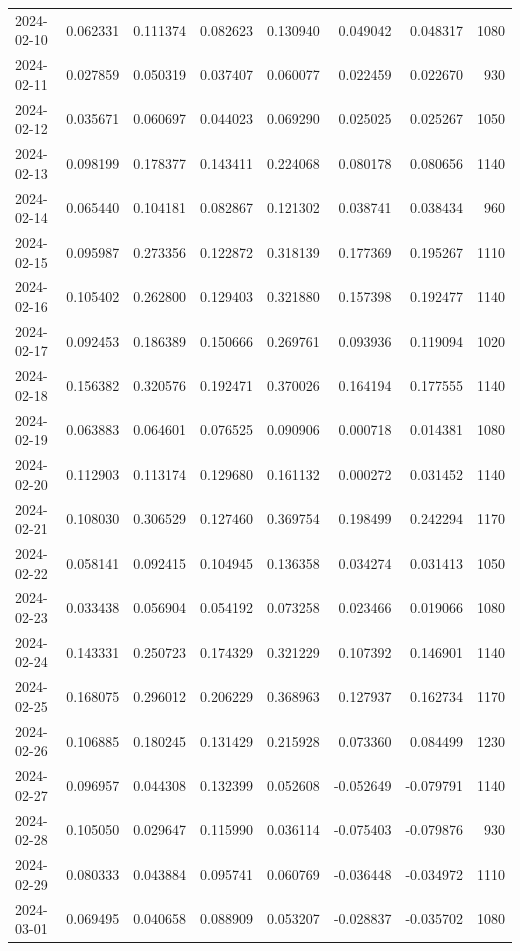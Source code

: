\begin{tabular}{lrrrrrrr}
2024-02-10 & 0.062331 & 0.111374 & 0.082623 & 0.130940 & 0.049042 & 0.048317 & 1080 \\
2024-02-11 & 0.027859 & 0.050319 & 0.037407 & 0.060077 & 0.022459 & 0.022670 & 930 \\
2024-02-12 & 0.035671 & 0.060697 & 0.044023 & 0.069290 & 0.025025 & 0.025267 & 1050 \\
2024-02-13 & 0.098199 & 0.178377 & 0.143411 & 0.224068 & 0.080178 & 0.080656 & 1140 \\
2024-02-14 & 0.065440 & 0.104181 & 0.082867 & 0.121302 & 0.038741 & 0.038434 & 960 \\
2024-02-15 & 0.095987 & 0.273356 & 0.122872 & 0.318139 & 0.177369 & 0.195267 & 1110 \\
2024-02-16 & 0.105402 & 0.262800 & 0.129403 & 0.321880 & 0.157398 & 0.192477 & 1140 \\
2024-02-17 & 0.092453 & 0.186389 & 0.150666 & 0.269761 & 0.093936 & 0.119094 & 1020 \\
2024-02-18 & 0.156382 & 0.320576 & 0.192471 & 0.370026 & 0.164194 & 0.177555 & 1140 \\
2024-02-19 & 0.063883 & 0.064601 & 0.076525 & 0.090906 & 0.000718 & 0.014381 & 1080 \\
2024-02-20 & 0.112903 & 0.113174 & 0.129680 & 0.161132 & 0.000272 & 0.031452 & 1140 \\
2024-02-21 & 0.108030 & 0.306529 & 0.127460 & 0.369754 & 0.198499 & 0.242294 & 1170 \\
2024-02-22 & 0.058141 & 0.092415 & 0.104945 & 0.136358 & 0.034274 & 0.031413 & 1050 \\
2024-02-23 & 0.033438 & 0.056904 & 0.054192 & 0.073258 & 0.023466 & 0.019066 & 1080 \\
2024-02-24 & 0.143331 & 0.250723 & 0.174329 & 0.321229 & 0.107392 & 0.146901 & 1140 \\
2024-02-25 & 0.168075 & 0.296012 & 0.206229 & 0.368963 & 0.127937 & 0.162734 & 1170 \\
2024-02-26 & 0.106885 & 0.180245 & 0.131429 & 0.215928 & 0.073360 & 0.084499 & 1230 \\
2024-02-27 & 0.096957 & 0.044308 & 0.132399 & 0.052608 & -0.052649 & -0.079791 & 1140 \\
2024-02-28 & 0.105050 & 0.029647 & 0.115990 & 0.036114 & -0.075403 & -0.079876 & 930 \\
2024-02-29 & 0.080333 & 0.043884 & 0.095741 & 0.060769 & -0.036448 & -0.034972 & 1110 \\
2024-03-01 & 0.069495 & 0.040658 & 0.088909 & 0.053207 & -0.028837 & -0.035702 & 1080 \\

\end{tabular}

